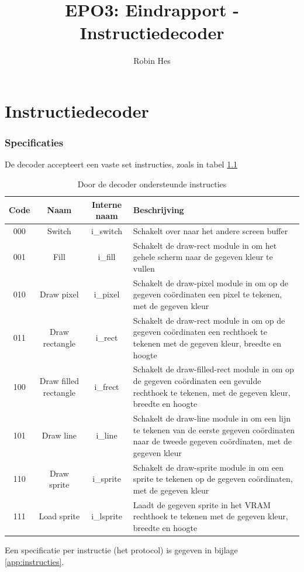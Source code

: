 \documentclass{scrartcl} %
\title{EPO3: Eindrapport - Instructiedecoder}
\author{Robin Hes}
\begin{document}
\chapter{Instructiedecoder}
\label{ch:decoder}
\subsection{Specificaties}
De decoder accepteert een vaste set instructies, zoals in tabel \ref{tab:decoder-instruction}

\begin{table}[H]
	\centering
	\caption{Door de decoder ondersteunde instructies}
	\label{tab:decoder-instruction}
	\begin{tabular}{c c c p{}}
		\hline\hline
		Code & Naam & Interne naam & Beschrijving \\
		\hline
		000 & Switch & i\_switch & Schakelt over naar het andere screen buffer \\
		001 & Fill & i\_fill & Schakelt de draw-rect module in om het gehele scherm naar de gegeven kleur te vullen \\
		010 & Draw pixel & i\_pixel & Schakelt de draw-pixel module in om op de gegeven coördinaten een pixel te tekenen, met de gegeven kleur \\
		011 & Draw rectangle & i\_rect & Schakelt de draw-rect module in om op de gegeven coördinaten een rechthoek te tekenen met de gegeven kleur, breedte en hoogte \\
		100 & Draw filled rectangle & i\_frect & Schakelt de draw-filled-rect module in om op de gegeven coördinaten een gevulde rechthoek te tekenen, met de gegeven kleur, breedte en hoogte \\
		101 & Draw line & i\_line & Schakelt de draw-line module in om een lijn te tekenen van de eerste gegeven coördinaten naar de tweede gegeven coördinaten, met de gegeven kleur \\
		110 & Draw sprite & i\_sprite & Schakelt de draw-sprite module in om een sprite te tekenen op de gegeven coördinaten, met de gegeven kleur \\
		111 & Load sprite & i\_lsprite & Laadt de gegeven sprite in het VRAM rechthoek te tekenen met de gegeven kleur, breedte en hoogte \\
		\end{tabular}
\end{table}
\small
Een specificatie per instructie (het protocol) is gegeven in bijlage \ref{app:instructies}.
\\\\
\end{document}
